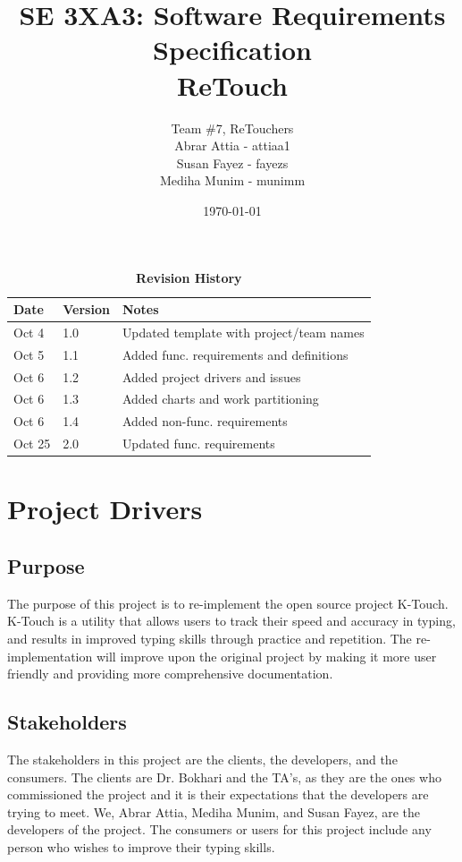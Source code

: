\documentclass[12pt, titlepage]{article}
\title{SE 3XA3: Software Requirements Specification\\ReTouch}
\author{Team \#7, ReTouchers
		\\ Abrar Attia - attiaa1
		\\ Susan Fayez - fayezs
		\\ Mediha Munim - munimm
}
\date{\today}
\begin{document}
\maketitle

\tableofcontents
\listoftables
\listoffigures

\begin{table}[bp]
\caption{\bf Revision History}
\begin{tabularx}{\textwidth}{p{3cm}p{2cm}X}
\toprule {\bf Date} & {\bf Version} & {\bf Notes}\\
\midrule
Oct 4 & 1.0 & Updated template with project/team names\\
Oct 5 & 1.1 & Added func. requirements and definitions \\
Oct 6 & 1.2 & Added project drivers and issues\\
Oct 6 & 1.3 & Added charts and work partitioning\\
Oct 6 & 1.4 & Added non-func. requirements \\
Oct 25 & 2.0 & Updated func. requirements \\
\bottomrule
\end{tabularx}
\end{table}

\newpage


\section{Project Drivers}
\subsection{Purpose}
\indent \indent The purpose of this project is to re-implement the open source project K-Touch. K-Touch is a utility that allows users to track their speed and accuracy in typing, and results in improved typing skills through practice and repetition. The re-implementation will improve upon the original project by making it more user friendly and providing more comprehensive documentation.

\subsection{Stakeholders}
\indent \indent The stakeholders in this project are the clients, the developers, and the consumers. The clients are Dr. Bokhari and the TA's, as they are the ones who commissioned the project and it is their expectations that the developers are trying to meet. We, Abrar Attia, Mediha Munim, and Susan Fayez, are the developers of the project. The consumers or users for this project include any person who wishes to improve their typing skills.
\end{document}
